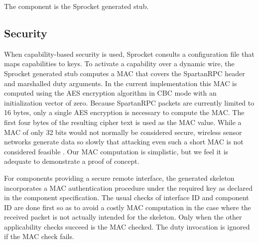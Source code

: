 The  component is the Sprocket generated stub.

\subsection{Security}

When capability-based security is used, Sprocket consults a configuration file that maps
capabilities to keys. To activate a capability over a dynamic wire, the Sprocket generated stub
computes a MAC that covers the SpartanRPC header and marshalled duty arguments. In the current
implementation this MAC is computed using the AES encryption algorithm in CBC mode with an
initialization vector of zero. Because SpartanRPC packets are currently limited to 16 bytes,
only a single AES encryption is necessary to compute the MAC. The first four bytes of the
resulting cipher text is used as the MAC value. While a MAC of only 32 bits would not normally
be considered secure, wireless sensor networks generate data so slowly that attacking even such
a short MAC is not considered feasible \cite{karlog-tinysec-2004,luk-minisec-2007}. Our MAC
computation is simplistic, but we feel it is adequate to demonstrate a proof of concept.

For components providing a secure remote interface, the generated skeleton incorporates a MAC
authentication procedure under the required key as declared in the component specification. The
usual checks of interface ID and component ID are done first so as to avoid a costly MAC
computation in the case where the received packet is not actually intended for the skeleton.
Only when the other applicability checks succeed is the MAC checked. The duty invocation is
ignored if the MAC check fails.
